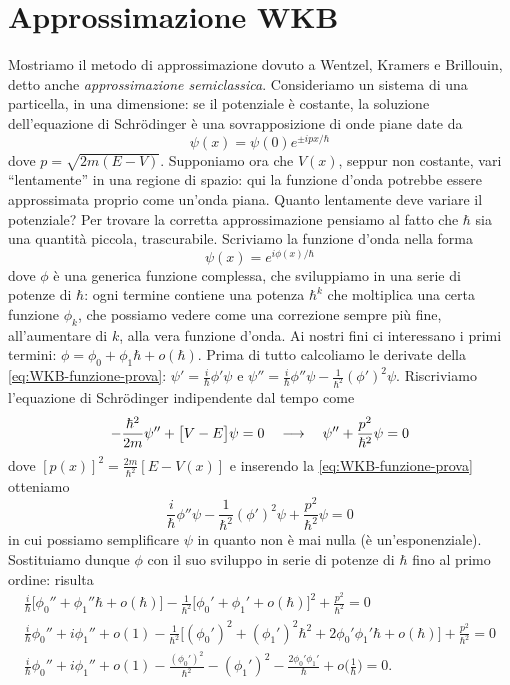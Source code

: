 \section{Approssimazione WKB}
Mostriamo il metodo di approssimazione dovuto a Wentzel, Kramers e Brillouin, detto anche \emph{approssimazione semiclassica}.
Consideriamo un sistema di una particella, in una dimensione: se il potenziale è costante, la soluzione dell'equazione di Schr\"odinger è una sovrapposizione di onde piane date da
\begin{equation}
	\psi(x)=\psi(0)e^{\pm ipx/\hbar}
\end{equation}
dove $p=\sqrt{2m(E-V)}$.
Supponiamo ora che $V(x)$, seppur non costante, vari ``lentamente'' in una regione di spazio: qui la funzione d'onda potrebbe essere approssimata proprio come un'onda piana.
Quanto lentamente deve variare il potenziale?
Per trovare la corretta approssimazione pensiamo al fatto che $\hbar$ sia una quantità piccola, trascurabile.
Scriviamo la funzione d'onda nella forma
\begin{equation}
	\psi(x)=e^{i\phi(x)/\hbar}
	\label{eq:WKB-funzione-prova}
\end{equation}
dove $\phi$ è una generica funzione complessa, che sviluppiamo in una serie di potenze di $\hbar$: ogni termine contiene una potenza $\hbar^k$ che moltiplica una certa funzione $\phi_k$, che possiamo vedere come una correzione sempre più fine, all'aumentare di $k$, alla vera funzione d'onda.
Ai nostri fini ci interessano i primi termini: $\phi=\phi_0+\phi_1\hbar+o(\hbar)$.
Prima di tutto calcoliamo le derivate della \eqref{eq:WKB-funzione-prova}: $\psi'=\frac{i}{\hbar}\phi'\psi$ e $\psi''=\frac{i}{\hbar}\phi''\psi-\frac1{\hbar^2}(\phi')^2\psi$.
Riscriviamo l'equazione di Schr\"odinger indipendente dal tempo come
\begin{equation}
	-\frac{\hbar^2}{2m}\psi''+\big[V-E\big]\psi=0\quad\longrightarrow\quad \psi''+\frac{p^2}{\hbar^2}\psi=0
\end{equation}
dove $[p(x)]^2=\frac{2m}{\hbar^2}[E-V(x)]$ e inserendo la \eqref{eq:WKB-funzione-prova} otteniamo
\begin{equation}
	\frac{i}{\hbar}\phi''\psi-\frac1{\hbar^2}(\phi')^2\psi+\frac{p^2}{\hbar^2}\psi=0
\end{equation}
in cui possiamo semplificare $\psi$ in quanto non è mai nulla (è un'esponenziale).
Sostituiamo dunque $\phi$ con il suo sviluppo in serie di potenze di $\hbar$ fino al primo ordine: risulta
\begin{equation}
	\begin{gathered}
		\frac{i}{\hbar}\big[\phi_0''+\phi_1''\hbar+o(\hbar)\big]-\frac1{\hbar^2}\big[\phi_0'+\phi_1'+o(\hbar)\big]^2+\frac{p^2}{\hbar^2}=0\\
		\frac{i}{\hbar}\phi_0''+i\phi_1''+o(1)-\frac1{\hbar^2}\big[(\phi_0')^2+(\phi_1')^2\hbar^2+2\phi_0'\phi_1'\hbar+o(\hbar)\big]+\frac{p^2}{\hbar^2}=0\\
		\frac{i}{\hbar}\phi_0''+i\phi_1''+o(1)-\frac{(\phi_0')^2}{\hbar^2}-(\phi_1')^2-\frac{2\phi_0'\phi_1'}{\hbar}+o\Big(\frac1{\hbar}\Big)=0.
	\end{gathered}
\end{equation}

